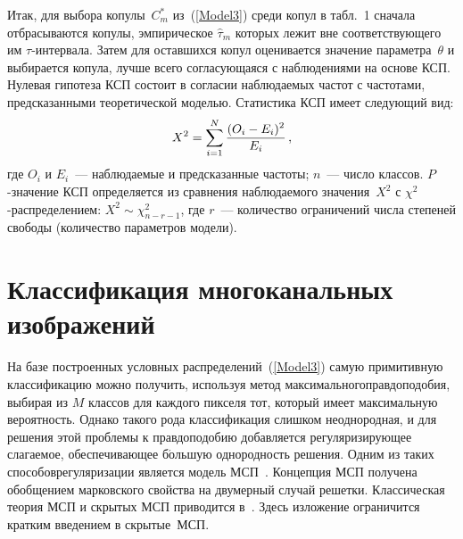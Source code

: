 \begin{multicols}{2}
Итак, для выбора копулы~$C_m^*$ из~(\ref{Model3}) среди копул в
табл.~1 сначала отбрасываются копулы, эмпирическое $\hat{\tau}_m$
которых лежит вне соответствующего им $\tau$-интервала. Затем для
оставшихся копул оценивается значение параметра~$\theta$ и
выбирается копула, лучше всего согласующаяся с наблюдениями на
основе КСП. Нулевая гипотеза КСП состоит в согласии наблюдаемых
частот с частотами, предсказанными теоретической моделью. Статистика
КСП имеет следующий вид:
$$
X^2 = \sum\limits_{i=1}^N \displaystyle\frac{\displaystyle (O_i - E_i)^2\mathstrut}{\displaystyle E_i\mathstrut}\,,
$$
где $O_i$ и $E_i$~--- наблюдаемые и предсказанные частоты; $n$~--- число классов.
$P$-значение КСП определяется из сравнения наблюдаемого значения~$X^2$ с 
$\chi^2$-рас\-пре\-де\-ле\-ни\-ем: $X^2\sim\chi_{n-r-1}^2$, где $r$~--- количество ограничений числа степеней свободы
(количество параметров модели).

\section{Классификация многоканальных изображений}


На базе построенных условных распределений~(\ref{Model3}) самую примитивную классификацию 
можно получить, используя метод максимального\linebreak правдоподобия,
выбирая из $M$ классов для каж\-до\-го пикселя тот, который имеет максимальную вероятность.
Однако такого рода классификация слишком неоднородная, и для решения этой проб\-ле\-мы к правдоподобию добавляется
регуляризи\-рующее слагаемое, обеспечивающее б$\acute{\mbox{о}}$льшую однородность решения. 
Одним из таких способов\linebreak регуляризации является модель МСП~\cite{BesagMRF}. 
Концепция МСП получена обобщением марковского свойства на двумерный случай решетки. 
Классическая теория МСП и скрытых МСП приводится в~\cite{BesagMRF}.
Здесь изложение ограничится кратким введением в скрытые~МСП.

\begin{figure*}[b] %
\vspace*{1pt}
\begin{center}
\mbox{%
\epsfxsize=163.235mm
}
\end{center}
\vspace*{-6pt}
\end{figure*}


\end{multicols}
